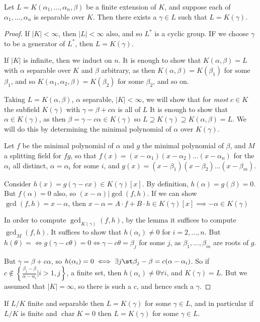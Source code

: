 \documentclass[a4paper, 10pt, twocolumn]{amsart}
\renewcommand{\charr}{\operatorname{char}}
\begin{document}
\begin{theorem}
Let $L = K(\alpha_1, \ldots, \alpha_n, \beta)$ be a finite extension of $K$, and suppose each of $\alpha_1, \ldots, \alpha_n$ is separable over $K$. Then there exists a $\gamma \in L$ such that $L = K(\gamma)$.
\end{theorem}
\begin{proof}
If $|K| < \infty$, then $|L|<\infty$ also, and so $L^\ast$ is a cyclic group. IF we choose $\gamma$ to be a generator of $L^\ast$, then $L=K(\gamma)$.

If $|K|$ is infinite, then we induct on $n$. It is enough to show that $K(\alpha, \beta) = L$ with $\alpha$ separable over $K$ and $\beta$ arbitrary, as then $K(\alpha, \beta) = K(\beta_1)$ for some $\beta_1$, and so $K(\alpha_1, \alpha_2, \beta) = K(\beta_2)$ for some $\beta_2$, and so on.

Taking $L=K(\alpha, \beta)$, $\alpha$ separable, $|K|<\infty$, we will show that for \textit{most} $c\in K$ the subfield $K(\gamma)$ with $\gamma = \beta+c\alpha$ is all of $L$ It is enough to show that $\alpha \in K(\gamma)$, as then $\beta = \gamma-c\alpha \in K(\gamma)$ so $L \supseteq K(\gamma) \supseteq K(\alpha, \beta) = L$. We will do this by determining the minimal polynomial of $\alpha$ over $K(\gamma)$.

Let $f$ be the minimal polynomial of $\alpha$ and $g$ the minimal polynomial of $\beta$, and $M$ a splitting field for $fg$, so that $f(x) = (x-\alpha_1)(x-\alpha_2)\ldots(x-\alpha_n)$ for the $\alpha_i$ all distinct, $\alpha = \alpha_i$ for some $i$, and $g(x) = (x-\beta_1)(x-\beta_2)\ldots(x-\beta_m)$.

Consider $h(x) = g(\gamma-cx) \in K(\gamma)[x]$. By definition, $h(\alpha) = g(\beta) = 0$. But $f(\alpha) = 0$ also, so $(x-\alpha)|\gcd(f,h)$. If we can show $\gcd(f,h) = x-\alpha$, then $x-\alpha = A\cdot f + B\cdot h \in K(\gamma)[x] \implies -\alpha \in K(\gamma)$ 

In order to compute $\gcd_{K(\gamma)} (f,h)$, by the lemma it suffices to compute $\gcd_M(f,h)$. It suffices to show that $h(\alpha_i) \neq 0$ for $i=2, \ldots, n$. But $h(\theta) =  \iff g(\gamma-c\theta)=0 \iff \gamma-c\theta = \beta_j$ for some $j$, as $\beta_1, \ldots, \beta_m$ are roots of $g$.

But $\gamma = \beta+c\alpha$, so $h(\alpha_i) = 0 \iff \exists j \st \beta_j-\beta = c(\alpha-\alpha_i)$. So if $c\notin \left\{\frac{\beta_j-\beta}{\alpha-\alpha_i}|i>1, j\right\}$, a finite set, then $h(\alpha_i)\neq 0\forall i$, and $K(\gamma)=L$. But we assumed that $|K|=\infty$, so there is such a $c$, and hence such a $\gamma$.
\end{proof}
\begin{corollary}
If $L/K$ finite and separable then $L=K(\gamma)$ for some $\gamma \in L$, and in particular if $L/K$ is finite and $\charr K = 0$ then $L=K(\gamma)$ for some $\gamma \in L$.
\end{corollary}
\end{document}
